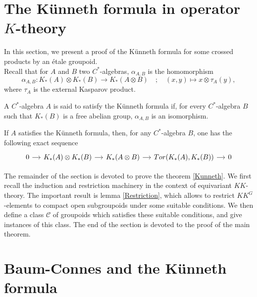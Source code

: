 \section{The Künneth formula in operator $K$-theory}

In this section, we present a proof of the Künneth formula for some crossed products by an étale groupoid. \\

Recall that for $A$ and $B$ two $C^*$-algebras, $\alpha_{A,B}$ is the homomorphism
\[\alpha_{A,B} : K_*(A)\otimes K_*(B)\rightarrow K_*(A\otimes B) \quad ; \quad (x,y)\mapsto x\otimes   \tau_A(y),\]
where $\tau_A$ is the external Kasparov product.\\

\begin{definition}
A $C^*$-algebra $A$ is said to satisfy the Künneth formula if, for every $C^*$-algebra $B$ such that $K_*(B)$ is a free abelian group, $\alpha_{A,B}$ is an isomorphism.
\end{definition}

If $A$ satisfies the Künneth formula, then, for any $C^*$-algebra $B$, one has the following exact sequence
\[\begin{tikzcd}[column sep = small] 0 \arrow{r} & K_*(A)\otimes K_*(B)\arrow{r} & K_*(A\otimes B) \arrow{r} & Tor(K_*(A),K_*(B))\arrow{r} & 0 \end{tikzcd}\]

The remainder of the section is devoted to prove the theorem \ref{Kunneth}. We first recall the induction and restriction machinery in the context of equivariant $KK$-theory. The important result is lemma \ref{Restriction}, which allows to restrict $KK^G$-elements to compact open subgroupoids under some suitable conditions. We then define a class $\mathcal C$ of groupoids which satisfies these suitable conditions, and give instances of this class. The end of the section is devoted to the proof of the main theorem.



\section{Baum-Connes and the Künneth formula}

